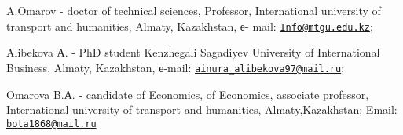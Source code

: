 A.Omarov - doctor of technical sciences, Professor, International
university of transport and humanities, Almaty, Kazakhstan, е- mail:
\href{mailto:Info@mtgu.edu.kz}{\nolinkurl{Info@mtgu.edu.kz}};

Alibekova А. - PhD student Kenzhegali Sagadiyev University of
International Business, Almaty, Kazakhstan, е-mail:
\href{mailto:ainura_alibekova97@mail.ru}{\nolinkurl{ainura\_alibekova97@mail.ru}};

Omarova B.А. - candidate of Economics, of Economics, associate
professor, International university of transport and humanities,
Almaty,Kazakhstan; Email:
\href{mailto:bota1868@mail.ru}{\nolinkurl{bota1868@mail.ru}}
